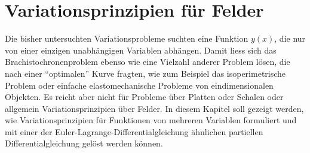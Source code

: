 %
%
%
\chapter{Variationsprinzipien für Felder
\label{buch:chapter:felder}}
Die bisher untersuchten Variationsprobleme suchten eine Funktion
$y(x)$, die nur von einer einzigen unabhängigen Variablen abhängen.
Damit liess sich das Brachistochronenproblem ebenso wie eine
Vielzahl anderer Problem lösen, die nach einer ``optimalen''
Kurve fragten, wie zum Beispiel das isoperimetrische Problem
oder einfache elastomechanische Probleme von eindimensionalen
Objekten.
Es reicht aber nicht für Probleme über Platten oder Schalen oder
allgemein Variationsprinzipien über Felder.
In diesem Kapitel soll gezeigt werden, wie Variationsprinzipien
für Funktionen von mehreren Variablen formuliert und mit einer
der Euler-Lagrange-Differentialgleichung ähnlichen partiellen
Differentialgleichung gelöst werden können.





